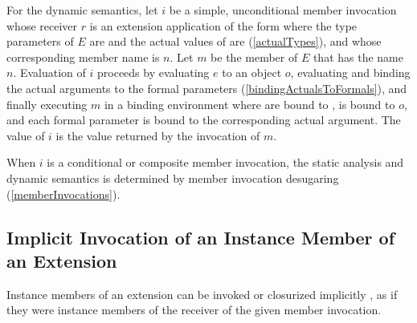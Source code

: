 \documentclass[makeidx]{article}
\begin{document}

\LMHash{}%
%
For the dynamic semantics,
let $i$ be a simple, unconditional member invocation
whose receiver $r$ is an extension application of the form
%
where the type parameters of $E$ are 
and the actual values of  are 
(\ref{actualTypes}),
%
and whose corresponding member name is $n$.
Let $m$ be the member of $E$ that has the name $n$.
Evaluation of $i$ proceeds by evaluating
$e$ to an object $o$,
evaluating and binding the actual arguments to the formal parameters
(\ref{bindingActualsToFormals}),
and finally executing $m$
in a binding environment where  are bound to ,
\THIS{} is bound to $o$,
and each formal parameter is bound to the corresponding actual argument.
The value of $i$ is the value returned by the invocation of $m$.

\LMHash{}%
When $i$ is a conditional or composite member invocation,
the static analysis and dynamic semantics is determined by
member invocation desugaring
(\ref{memberInvocations}).



\subsection{Implicit Invocation of an Instance Member of an Extension}

\LMHash{}%
Instance members of an extension can be invoked or closurized implicitly
,
as if they were instance members of the receiver of
the given member invocation.

\end{document}
